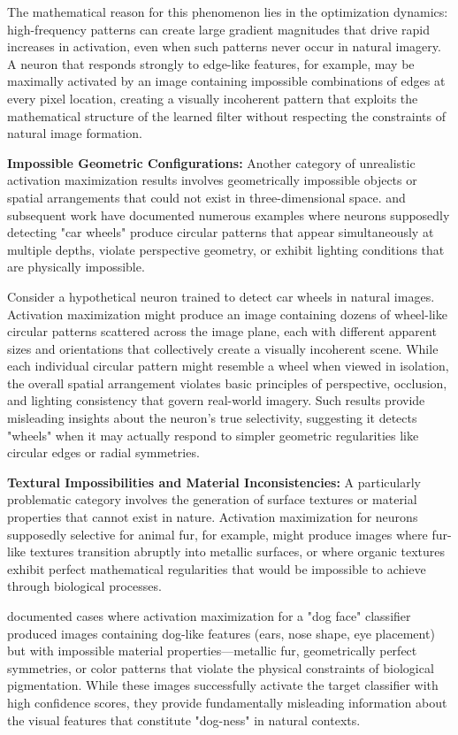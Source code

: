 The mathematical reason for this phenomenon lies in the optimization dynamics: high-frequency patterns can create large gradient magnitudes that drive rapid increases in activation, even when such patterns never occur in natural imagery. A neuron that responds strongly to edge-like features, for example, may be maximally activated by an image containing impossible combinations of edges at every pixel location, creating a visually incoherent pattern that exploits the mathematical structure of the learned filter without respecting the constraints of natural image formation.

\textbf{Impossible Geometric Configurations:} Another category of unrealistic activation maximization results involves geometrically impossible objects or spatial arrangements that could not exist in three-dimensional space. \citet{szegedy2014goingdeeperconvolutions} and subsequent work have documented numerous examples where neurons supposedly detecting "car wheels" produce circular patterns that appear simultaneously at multiple depths, violate perspective geometry, or exhibit lighting conditions that are physically impossible.

Consider a hypothetical neuron trained to detect car wheels in natural images. Activation maximization might produce an image containing dozens of wheel-like circular patterns scattered across the image plane, each with different apparent sizes and orientations that collectively create a visually incoherent scene. While each individual circular pattern might resemble a wheel when viewed in isolation, the overall spatial arrangement violates basic principles of perspective, occlusion, and lighting consistency that govern real-world imagery. Such results provide misleading insights about the neuron's true selectivity, suggesting it detects "wheels" when it may actually respond to simpler geometric regularities like circular edges or radial symmetries.

\textbf{Textural Impossibilities and Material Inconsistencies:} A particularly problematic category involves the generation of surface textures or material properties that cannot exist in nature. Activation maximization for neurons supposedly selective for animal fur, for example, might produce images where fur-like textures transition abruptly into metallic surfaces, or where organic textures exhibit perfect mathematical regularities that would be impossible to achieve through biological processes.

\citet{nguyen2016synthesizingpreferredinputsneurons} documented cases where activation maximization for a "dog face" classifier produced images containing dog-like features (ears, nose shape, eye placement) but with impossible material properties—metallic fur, geometrically perfect symmetries, or color patterns that violate the physical constraints of biological pigmentation. While these images successfully activate the target classifier with high confidence scores, they provide fundamentally misleading information about the visual features that constitute "dog-ness" in natural contexts.

